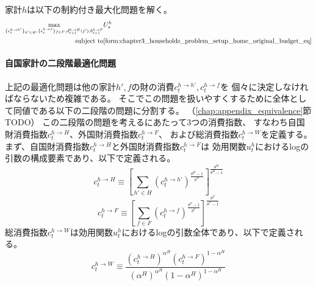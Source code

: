 家計\(h\)は以下の制約付き最大化問題を解く。
\begin{equation}
\label{form:chapter3_households_problem_setup_home_original_max}
    \begin{aligned}
        \max_{\{c_t^{h\to h'}\}_{h'\in H},\{c_t^{h\to f}\}_{f\in F},d_{t+1}^{h\to H}(j'),b_{t+1}^{h\to F}}
        &U_s^h\\
        \text{subject to}
        &\eqref{form:chapter3_households_problem_setup_home_original_budget_eq}
    \end{aligned}
\end{equation}

\paragraph{自国家計の二段階最適化問題}
\label{sec:chapter3_households_problem_setup_home_two_stage}
上記の最適化問題は他の家計\(h',f\)の財の消費\(c_t^{h\to h'},c_t^{h\to f}\)を
個々に決定しなければならないため複雑である。
そこでこの問題を扱いやすくするために全体として同値である以下の二段階の問題に分割する。
（\ref{chap:appendix_equivalence}節TODO）
この二段階の問題を考えるにあたって3つの消費指数、
すなわち自国財消費指数\(c_t^{h\to H}\)、外国財消費指数\(c_t^{h\to F}\)、
および総消費指数\(c_t^{h\to W}\)を定義する。
まず、自国財消費指数\(c_t^{h\to H}\)と外国財消費指数\(c_t^{h\to F}\)は
効用関数\(u_t^h\)におけるlogの引数の構成要素であり、以下で定義される。
\begin{equation}
\label{form:chapter3_households_problem_setup_home_c_h_H_def}
    c_t^{h\to H}\equiv\left[\sum_{h'\in H}(c_t^{h\to h'})^{\frac{\theta^H-1}{\theta^H}}\right]^{\frac{\theta^H}{\theta^H-1}}
\end{equation}
\begin{equation}
\label{form:chapter3_households_problem_setup_home_c_h_F_def}
    c_t^{h\to F}\equiv\left[\sum_{f\in F}(c_t^{h\to f})^{\frac{\theta^F-1}{\theta^F}}\right]^{\frac{\theta^F}{\theta^F-1}}
\end{equation}
総消費指数\(c_t^{h\to W}\)は効用関数\(u_t^h\)におけるlogの引数全体であり、以下で定義される。
\begin{equation}
\label{form:chapter3_households_problem_setup_home_c_h_W_def}
    c_t^{h\to W}\equiv\frac{(c_t^{h\to H})^{\alpha^H}(c_t^{h\to F})^{1-\alpha^H}}{(\alpha^H)^{\alpha^H}(1-\alpha^H)^{1-\alpha^H}}
\end{equation}
